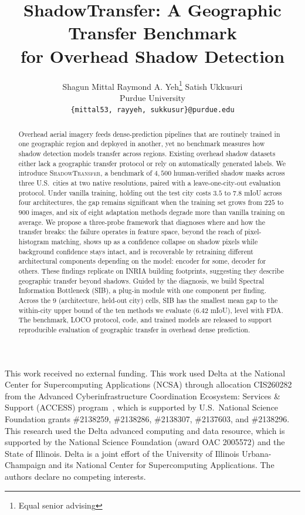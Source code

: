 \documentclass{article}
\title{ShadowTransfer: A Geographic Transfer Benchmark\\
for Overhead Shadow Detection}
\author{
Shagun Mittal \quad\quad Raymond A. Yeh\thanks{Equal senior advising} \quad\quad Satish Ukkusuri\footnotemark[1]\\
Purdue University\\
\texttt{\{mittal53, rayyeh, sukkusur\}@purdue.edu}
}
\newcommand{\shadow}{\textsc{ShadowTransfer}\xspace}
\newcommand{\sib}{\textsc{SIB}\xspace}
\begin{document}
\maketitle

\begin{abstract}
Overhead aerial imagery feeds dense-prediction pipelines that are routinely trained in one geographic region and deployed in another, yet no benchmark measures how shadow detection models transfer across regions. Existing overhead shadow datasets either lack a geographic transfer protocol or rely on automatically generated labels. We introduce \shadow, a benchmark of $4{,}500$ human-verified shadow masks across three U.S.\ cities at two native resolutions, paired with a leave-one-city-out evaluation protocol. %
Under vanilla training, holding out the test city costs $3.5$ to $7.8$ mIoU across four architectures, the gap remains significant when the training set grows from $225$ to $900$ images, and six of eight adaptation methods degrade more than vanilla training on average.
We propose a three-probe framework that diagnoses where and how the transfer breaks: the failure operates in feature space, beyond the reach of pixel-histogram matching, shows up as a confidence collapse on shadow pixels while background confidence stays intact, and is recoverable by retraining different architectural components depending on the model: encoder for some, decoder for others. These findings replicate on INRIA building footprints, suggesting they describe geographic transfer beyond shadows. 
Guided by the diagnosis, we build Spectral Information Bottleneck (SIB), a plug-in module with one component per finding. Across the $9$ (architecture, held-out city) cells, \sib{} has the smallest mean gap to the within-city upper bound of the ten methods we evaluate ($6.42$ mIoU), level with FDA. 
The benchmark, LOCO protocol, code, and trained models are released to support reproducible evaluation of geographic transfer in overhead dense prediction.
\end{abstract}













\begin{ack}
This work received no external funding. This work used Delta at the National Center for Supercomputing Applications (NCSA) through allocation CIS260282 from the Advanced Cyberinfrastructure Coordination Ecosystem: Services \& Support (ACCESS) program~\cite{boerner2023access}, which is supported by U.S.\ National Science Foundation grants \#2138259, \#2138286, \#2138307, \#2137603, and \#2138296. This research used the Delta advanced computing and data resource, which is supported by the National Science Foundation (award OAC 2005572) and the State of Illinois. Delta is a joint effort of the University of Illinois Urbana-Champaign and its National Center for Supercomputing Applications. The authors declare no competing interests.
\end{ack}
\end{document}
